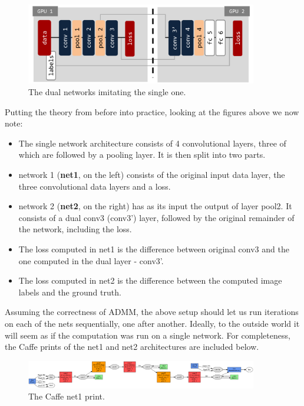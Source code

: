 \documentclass[a4paper, 12pt]{article}
\numberwithin{equation}{section}
\begin{document}
	\begin{figure}[!h]
		\centering
		\includegraphics[page=1,width=0.9\textwidth]{net12separate.pdf}
		\caption{\label{fig:net12separate}{The dual networks imitating the single one.}}
	\end{figure}

	Putting the theory from before into practice, looking at the figures above we now note:
	\begin{itemize}
		\item The single network architecture consists of 4 convolutional layers, three of which are followed by a pooling layer. It is then split into two parts.
		\item network 1 (\textbf{net1}, on the left) consists of the original input data layer, the three convolutional data layers and a loss.
		\item network 2 (\textbf{net2}, on the right) has as its input the output of layer pool2. It consists of a dual conv3 (conv3') layer, followed by the original remainder of the network, including the loss.
		\item The loss computed in net1 is the difference between original conv3 and the one computed in the dual layer - conv3'.
		\item The loss computed in net2 is the difference between the computed image labels and the ground truth.
	\end{itemize}

	Assuming the correctness of ADMM, the above setup should let us run iterations on each of the nets sequentially, one after another. Ideally, to the outside world it will seem as if the computation was run on a single network. For completeness, the Caffe prints of the net1 and net2 architectures are included below.

	\begin{figure}[!h]
		\centering
		\includegraphics[page=1,width=0.9\textwidth]{net1.png}
		\caption{\label{fig:net1}{The Caffe net1 print.}}
	\end{figure}
\end{document}
